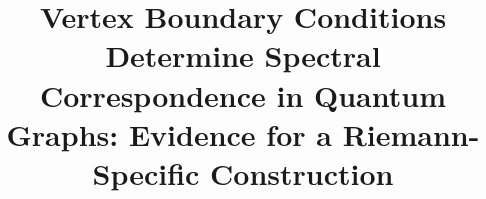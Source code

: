 \documentclass[cntp]{ipart}
\theoremstyle{plain}
\theoremstyle{remark}
\begin{document}
\begin{frontmatter}

\title[Vertex Boundary Conditions in Quantum Graphs]{Vertex Boundary Conditions Determine Spectral Correspondence in Quantum Graphs: Evidence for a Riemann-Specific Construction}

\begin{aug}
    \author{ }
    \address{Department of Computer Science\\
             Colorado State University\\
             Fort Collins, CO 80523, USA\\
             and MERLN LLC\\
             Irving, TX 75038, USA\\
             }
\end{aug}


\end{frontmatter}
\end{document}
